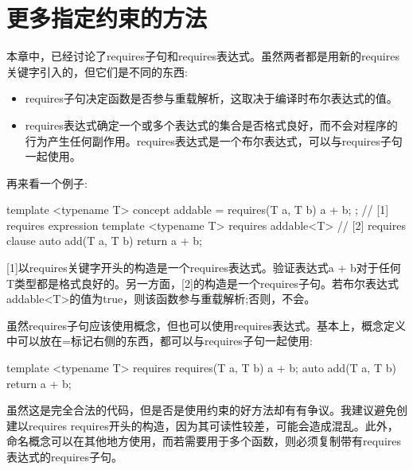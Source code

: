 \section{更多指定约束的方法}
本章中，已经讨论了requires子句和requires表达式。虽然两者都是用新的requires关键字引入的，但它们是不同的东西:

\begin{itemize}
\item
requires子句决定函数是否参与重载解析，这取决于编译时布尔表达式的值。

\item
requires表达式确定一个或多个表达式的集合是否格式良好，而不会对程序的行为产生任何副作用。requires表达式是一个布尔表达式，可以与requires子句一起使用。
\end{itemize}

再来看一个例子:

\begin{cpp}
template <typename T>
concept addable = requires(T a, T b) { a + b; };
                       // [1] requires expression
template <typename T>
requires addable<T> // [2] requires clause
auto add(T a, T b)
{
	return a + b;
}
\end{cpp}

[1]以requires关键字开头的构造是一个requires表达式。验证表达式a + b对于任何T类型都是格式良好的。另一方面，[2]的构造是一个requires子句。若布尔表达式addable<T>的值为true，则该函数参与重载解析;否则，不会。

虽然requires子句应该使用概念，但也可以使用requires表达式。基本上，概念定义中可以放在=标记右侧的东西，都可以与requires子句一起使用:

\begin{cpp}
template <typename T>
	requires requires(T a, T b) { a + b; }
auto add(T a, T b)
{
	return a + b;
}
\end{cpp}

虽然这是完全合法的代码，但是否是使用约束的好方法却有有争议。我建议避免创建以requires requires开头的构造，因为其可读性较差，可能会造成混乱。此外，命名概念可以在其他地方使用，而若需要用于多个函数，则必须复制带有requires表达式的requires子句。

